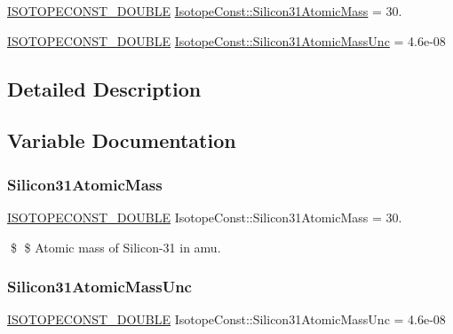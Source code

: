 \begin{DoxyCompactItemize}
\item 
\mbox{\hyperlink{group___isotope_const-_macros_ga8f45a7272ce02c0b4c65c44636ed719a}{I\+S\+O\+T\+O\+P\+E\+C\+O\+N\+S\+T\+\_\+\+D\+O\+U\+B\+LE}} \mbox{\hyperlink{group___isotope_const-_silicon-_si31_ga14d05ca6655ee3352da89910b8a13da4}{Isotope\+Const\+::\+Silicon31\+Atomic\+Mass}} = 30.
\item 
\mbox{\hyperlink{group___isotope_const-_macros_ga8f45a7272ce02c0b4c65c44636ed719a}{I\+S\+O\+T\+O\+P\+E\+C\+O\+N\+S\+T\+\_\+\+D\+O\+U\+B\+LE}} \mbox{\hyperlink{group___isotope_const-_silicon-_si31_gaf7488f8a0a042b83a539cc28e2a42458}{Isotope\+Const\+::\+Silicon31\+Atomic\+Mass\+Unc}} = 4.\+6e-\/08
\end{DoxyCompactItemize}


\subsection{Detailed Description}


\subsection{Variable Documentation}
\mbox{\label{group___isotope_const-_silicon-_si31_ga14d05ca6655ee3352da89910b8a13da4}} 
\subsubsection{\texorpdfstring{Silicon31\+Atomic\+Mass}{Silicon31AtomicMass}}
{\footnotesize\ttfamily \mbox{\hyperlink{group___isotope_const-_macros_ga8f45a7272ce02c0b4c65c44636ed719a}{I\+S\+O\+T\+O\+P\+E\+C\+O\+N\+S\+T\+\_\+\+D\+O\+U\+B\+LE}} Isotope\+Const\+::\+Silicon31\+Atomic\+Mass = 30.}

\$ \$ Atomic mass of Silicon-\/31 in amu. \mbox{\label{group___isotope_const-_silicon-_si31_gaf7488f8a0a042b83a539cc28e2a42458}} 
\subsubsection{\texorpdfstring{Silicon31\+Atomic\+Mass\+Unc}{Silicon31AtomicMassUnc}}
{\footnotesize\ttfamily \mbox{\hyperlink{group___isotope_const-_macros_ga8f45a7272ce02c0b4c65c44636ed719a}{I\+S\+O\+T\+O\+P\+E\+C\+O\+N\+S\+T\+\_\+\+D\+O\+U\+B\+LE}} Isotope\+Const\+::\+Silicon31\+Atomic\+Mass\+Unc = 4.\+6e-\/08}

